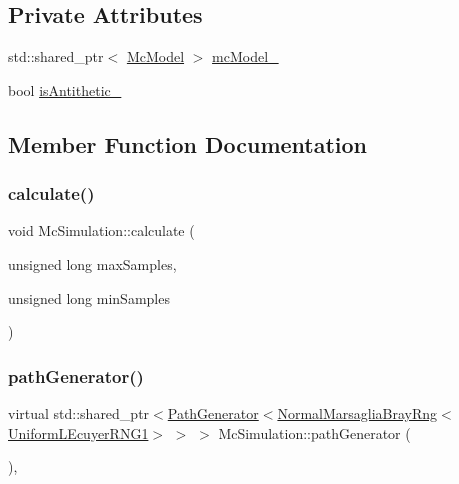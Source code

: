 \subsection*{Private Attributes}
\begin{DoxyCompactItemize}
\item 
std\+::shared\+\_\+ptr$<$ \hyperlink{class_mc_model}{Mc\+Model} $>$ \hyperlink{class_mc_simulation_a7f6445b880401bcd208fd921ca8d82c2}{mc\+Model\+\_\+}
\item 
bool \hyperlink{class_mc_simulation_aabbb28856a126b01552583a571e1e807}{is\+Antithetic\+\_\+}
\end{DoxyCompactItemize}


\subsection{Member Function Documentation}
\hypertarget{class_mc_simulation_a34949008df3c2b7fd4df32fac3875582}{}\label{class_mc_simulation_a34949008df3c2b7fd4df32fac3875582} 
\subsubsection{\texorpdfstring{calculate()}{calculate()}}
{\footnotesize\ttfamily void Mc\+Simulation\+::calculate (\begin{DoxyParamCaption}\item[{unsigned long}]{max\+Samples,  }\item[{unsigned long}]{min\+Samples }\end{DoxyParamCaption})}

\hypertarget{class_mc_simulation_ada27dc346c81cf3d7aff84188dd12381}{}\label{class_mc_simulation_ada27dc346c81cf3d7aff84188dd12381} 
\subsubsection{\texorpdfstring{path\+Generator()}{pathGenerator()}}
{\footnotesize\ttfamily virtual std\+::shared\+\_\+ptr$<$\hyperlink{class_path_generator}{Path\+Generator}$<$\hyperlink{class_normal_marsaglia_bray_rng}{Normal\+Marsaglia\+Bray\+Rng}$<$\hyperlink{class_uniform_l_ecuyer_r_n_g1}{Uniform\+L\+Ecuyer\+R\+N\+G1}$>$ $>$ $>$ Mc\+Simulation\+::path\+Generator (\begin{DoxyParamCaption}{ }\end{DoxyParamCaption})\hspace{0.3cm}{\ttfamily [private]}, {}}



